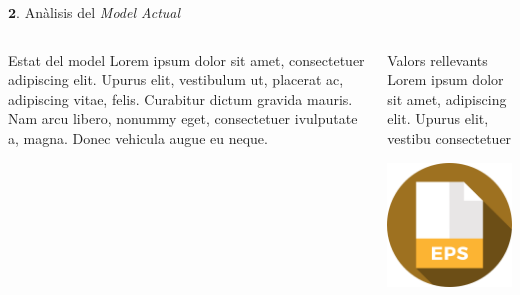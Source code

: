 \documentclass[twocolumn]{beamer}
\begin{document}
\begin{frame}{$\mathbf 2.$ Anàlisis del \textit{Model Actual}}
\begin{columns}[t]
	\begin{column}{.5\textwidth}
		\begin{block}{Estat del model}
	Lorem ipsum dolor sit amet,
	consectetuer adipiscing elit. Upurus elit, vestibulum ut,
	placerat ac, adipiscing vitae,
	felis. Curabitur dictum gravida
	mauris. Nam arcu libero,
	nonummy eget, consectetuer ivulputate a, magna. Donec
	vehicula augue eu neque.
		\end{block}
	\end{column}
	\begin{column}{.5\textwidth}
		\begin{block}{Valors rellevants}
		Lorem ipsum dolor sit amet,
		adipiscing elit. Upurus elit, vestibu
		consectetuer 
		\end{block}
	\includegraphics[width=3.5cm]{eps}
	\end{column}
\end{columns}
\end{frame}
\end{document}
